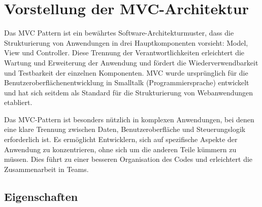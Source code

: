 
\chapter{Vorstellung der MVC-Architektur}
\label{chap:vorstellung}

Das \ac{MVC} Pattern ist ein bewährtes Software-Architekturmuster, dass die Strukturierung von Anwendungen in drei Hauptkomponenten vorsieht: Model, View und Controller. Diese Trennung der Verantwortlichkeiten erleichtert die Wartung und Erweiterung der Anwendung und fördert die Wiederverwendbarkeit und Testbarkeit der einzelnen Komponenten. \ac{MVC} wurde ursprünglich für die Benutzeroberflächenentwicklung in Smalltalk (Programmiersprache) entwickelt und hat sich seitdem als Standard für die Strukturierung von Webanwendungen etabliert.

Das \ac{MVC}-Pattern ist besonders nützlich in komplexen Anwendungen, bei denen eine klare Trennung zwischen Daten, Benutzeroberfläche und Steuerungslogik erforderlich ist. Es ermöglicht Entwicklern, sich auf spezifische Aspekte der Anwendung zu konzentrieren, ohne sich um die anderen Teile kümmern zu müssen. Dies führt zu einer besseren Organisation des Codes und erleichtert die Zusammenarbeit in Teams.


\section{Eigenschaften}

